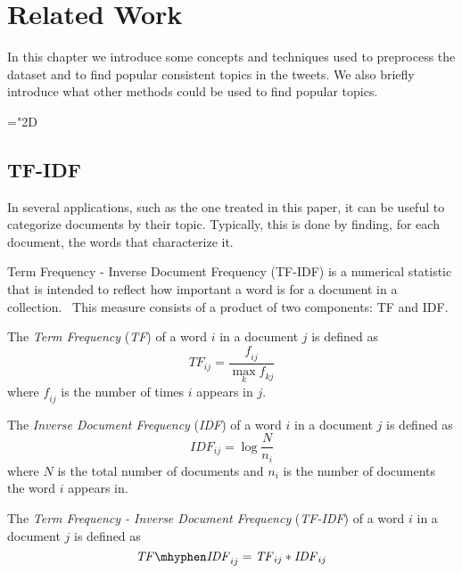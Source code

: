 \section{Related Work}
\label{sec:rw}
In this chapter we introduce some concepts and techniques used to preprocess 
the dataset and to find popular consistent topics in the tweets.
We also briefly introduce what other methods could be used to find 
popular topics.

\mathchardef\mhyphen="2D
\subsection{TF-IDF}

In several applications, such as the one treated in this paper, 
it can be useful to categorize documents by their topic. Typically, this 
is done by finding, for each document, the words that characterize it.

Term Frequency - Inverse Document Frequency (TF-IDF) is a numerical statistic 
that is intended to reflect how important a word is for a document in a collection.~\cite{rw:tfidf}
This measure consists of a product of two components: TF and IDF.

\begin{definition}
    The \emph{Term Frequency} (\emph{TF}) of a word $i$ in a document $j$ is defined as
    \begin{equation*}
        \mathit{TF}_{ij} = \frac{\mathit{f}_{ij}}{\max_k{\mathit{f}_{kj}}}
    \end{equation*}
    where 
    $\mathit{f}_{ij}$ is the number of times $i$ appears in $j$.
\end{definition}

\begin{definition}
    The \emph{Inverse Document Frequency} (\emph{IDF}) of a word $i$ in a document $j$ is defined as
    \begin{equation*}
        \mathit{IDF}_{ij} = \log{\frac{N}{n_i}}
    \end{equation*}
    where $N$ is the total number of documents and $n_i$ is the number of documents the word $i$
    appears in.
\end{definition}

\begin{definition}
    The \emph{Term Frequency - Inverse Document Frequency} (\emph{TF-IDF}) of a word $i$ in a document 
    $j$ is defined as
    \begin{equation*}
        \mathit{TF \mhyphen IDF}_{ij} = \mathit{TF}_{ij} * \mathit{IDF}_{ij}
    \end{equation*}
\end{definition}

